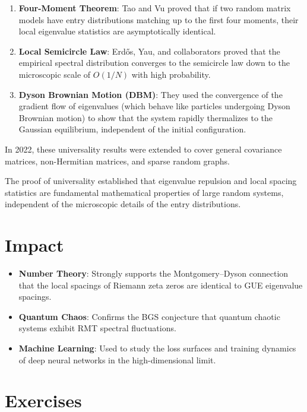 \begin{enumerate}
\item \textbf{Four-Moment Theorem}: Tao and Vu proved that if two random matrix models have entry distributions matching up to the first four moments, their local eigenvalue statistics are asymptotically identical.
\item \textbf{Local Semicircle Law}: Erdős, Yau, and collaborators proved that the empirical spectral distribution converges to the semicircle law down to the microscopic scale of $O(1/N)$ with high probability.
\item \textbf{Dyson Brownian Motion (DBM)}: They used the convergence of the gradient flow of eigenvalues (which behave like particles undergoing Dyson Brownian motion) to show that the system rapidly thermalizes to the Gaussian equilibrium, independent of the initial configuration.
\end{enumerate}

In 2022, these universality results were extended to cover general covariance matrices, non-Hermitian matrices, and sparse random graphs.

\begin{highlightbox}
The proof of universality established that eigenvalue repulsion and local spacing statistics are fundamental mathematical properties of large random systems, independent of the microscopic details of the entry distributions.
\end{highlightbox}

\section{Impact}
\begin{itemize}
\item \textbf{Number Theory}: Strongly supports the Montgomery--Dyson connection that the local spacings of Riemann zeta zeros are identical to GUE eigenvalue spacings.
\item \textbf{Quantum Chaos}: Confirms the BGS conjecture that quantum chaotic systems exhibit RMT spectral fluctuations.
\item \textbf{Machine Learning}: Used to study the loss surfaces and training dynamics of deep neural networks in the high-dimensional limit.
\end{itemize}

\section{Exercises}

